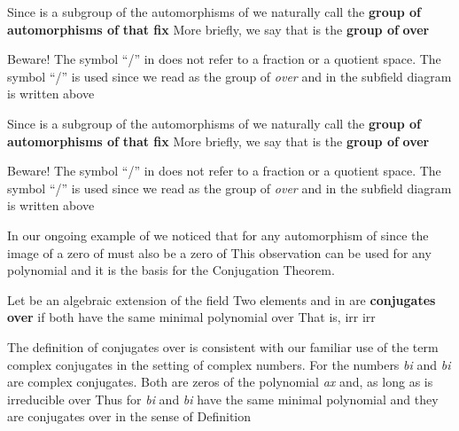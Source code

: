 \documentclass[11pt,oneside]{article}
\begin{document}
\begin{BookBody}

Since  is a subgroup of the automorphisms of  we naturally call  the\textbf{ group of automorphisms of}  \textbf{that fix}  More briefly, we say that  is the \textbf{group of}  \textbf{over} 

Beware! The symbol “/” in  does not refer to a fraction or a quotient space. The symbol “/” is used since we read  as the group of  \textit{over}  and in the subfield diagram is written above 

Since  is a subgroup of the automorphisms of  we naturally call  the\textbf{ group of automorphisms of}  \textbf{that fix}  More briefly, we say that  is the \textbf{group of}  \textbf{over} 

Beware! The symbol “/” in  does not refer to a fraction or a quotient space. The symbol “/” is used since we read  as the group of  \textit{over}  and in the subfield diagram is written above 


In our ongoing example of  we noticed that for any automorphism \BookInline{\sigma } of  since the image of a zero of  must also be a zero of  This observation can be used for any polynomial and it is the basis for the Conjugation Theorem.

 Let  be an algebraic extension of the field  Two elements \BookInline{\alpha } and \BookInline{\beta } in  are \textbf{conjugates over}  if both have the same minimal polynomial over  That is, irr irr\BookEnd{\blacksquare}

 The definition of conjugates over  is consistent with our familiar use of the term complex conjugates in the setting of complex numbers. For  the numbers  \textit{bi} and  \textit{bi} are complex conjugates. Both are zeros of the polynomial \textit{ax} \BookInline{+ }  and, as long as  is irreducible over  Thus for  \textit{bi} and  \textit{bi} have the same minimal polynomial and they are conjugates over  in the sense of Definition \BookEnd{\blacktriangle}


\end{BookBody}
\end{document}
